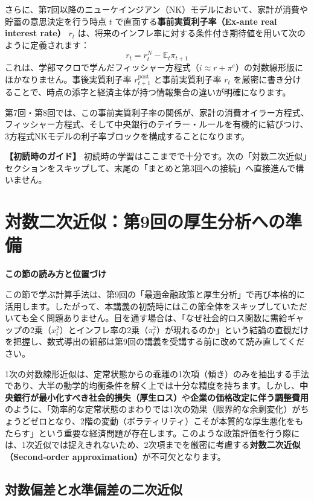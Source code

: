 \documentclass[
  japanese,
  lualatex,
  ja=standard,
  12pt,
  a4paper]{ltjsarticle}
\begin{document}
さらに、第7回以降のニューケインジアン（NK）モデルにおいて、家計が消費や貯蓄の意思決定を行う時点
\(t\) で直面する\textbf{事前実質利子率（Ex-ante real interest rate）}
\(r_t\)
は、将来のインフレ率に対する条件付き期待値を用いて次のように定義されます：
\[
r_t
=
r_t^N-\mathbb{E}_t\pi_{t+1}
\]
これは、学部マクロで学んだフィッシャー方程式（\(i \approx r + \pi^e\)）の対数線形版にほかなりません。事後実質利子率
\(r_{t+1}^{\mathrm{post}}\) と事前実質利子率 \(r_t\)
を厳密に書き分けることで、時点の添字と経済主体が持つ情報集合の違いが明確になります。

第7回・第8回では、この事前実質利子率の関係が、家計の消費オイラー方程式、フィッシャー方程式、そして中央銀行のテイラー・ルールを有機的に結びつけ、3方程式NKモデルの利子率ブロックを構成することになります。

\textbf{【初読時のガイド】}
初読時の学習はここまでで十分です。次の「対数二次近似」セクションをスキップして、末尾の「まとめと第3回への接続」へ直接進んで構いません。

\newpage

\section{対数二次近似：第9回の厚生分析への準備}\label{ux5bfeux6570ux4e8cux6b21ux8fd1ux4f3cux7b2c9ux56deux306eux539aux751fux5206ux6790ux3078ux306eux6e96ux5099}

\textbf{この節の読み方と位置づけ}

この節で学ぶ計算手法は、第9回の「最適金融政策と厚生分析」で再び本格的に活用します。したがって、本講義の初読時にはこの節全体をスキップしていただいても全く問題ありません。目を通す場合は、「なぜ社会的ロス関数に需給ギャップの2乗（\(x_t^2\)）とインフレ率の2乗（\(\pi_t^2\)）が現れるのか」という結論の直観だけを把握し、数式導出の細部は第9回の講義を受講する前に改めて読み直してください。

1次の対数線形近似は、定常状態からの乖離の1次項（傾き）のみを抽出する手法であり、大半の動学的均衡条件を解く上では十分な精度を持ちます。しかし、\textbf{中央銀行が最小化すべき社会的損失（厚生ロス）}や\textbf{企業の価格改定に伴う調整費用}のように、「効率的な定常状態のまわりでは1次の効果（限界的な余剰変化）がちょうどゼロとなり、2階の変動（ボラティリティ）こそが本質的な厚生悪化をもたらす」という重要な経済問題が存在します。このような政策評価を行う際には、1次近似では捉えきれないため、2次項までを厳密に考慮する\textbf{対数二次近似（Second-order
approximation）}が不可欠となります。

\subsection{対数偏差と水準偏差の二次近似}\label{ux5bfeux6570ux504fux5deeux3068ux6c34ux6e96ux504fux5deeux306eux4e8cux6b21ux8fd1ux4f3c}
\end{document}
